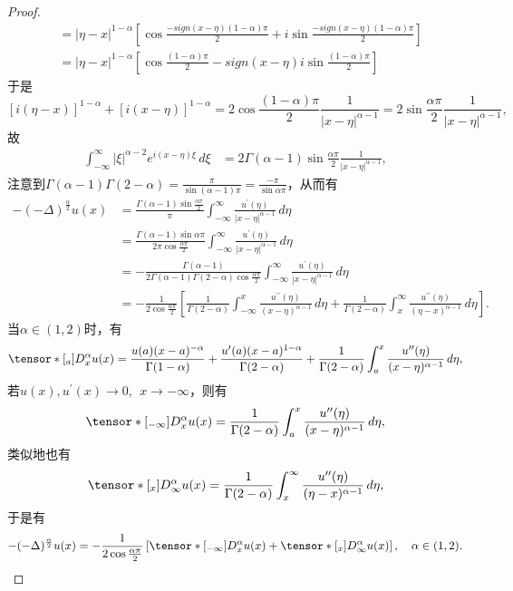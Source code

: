 \begin{proof}
$$\begin{aligned}
&=|\eta-x|^{1-\alpha}\left[ \cos \frac{-sign(x-\eta)(1-\alpha)\pi}2+i\sin \frac{-sign(x-\eta)(1-\alpha)\pi}2 \right]\\
&=|\eta-x|^{1-\alpha}\left[ \cos \frac{(1-\alpha)\pi}2-sign(x-\eta)i\sin \frac{(1-\alpha)\pi}2 \right]
\end{aligned}
$$
于是
$$
[i(\eta-x)]^{1-\alpha} + [i(x-\eta)]^{1-\alpha}=2\cos\frac{(1-\alpha)\pi}2\frac{1}{|x-\eta|^{\alpha-1}}=2\sin\frac{\alpha\pi}2\frac{1}{|x-\eta|^{\alpha-1}},
$$
故
$$
\begin{aligned}
\int_{-\infty}^\infty |\xi|^{\alpha-2}   e^{i(x-\eta)\xi}\,d\xi &= 2\Gamma(\alpha-1)\sin\frac{\alpha\pi}2   \frac{1}{|x-\eta|^{\alpha-1}},
\end{aligned}
$$
注意到$\Gamma(\alpha-1)\Gamma(2-\alpha)=\frac{\pi}{\sin(\alpha-1)\pi}=\frac{-\pi}{\sin\alpha\pi}$，从而有
$$
\begin{aligned}
-(-\Delta)^{\frac\alpha2}u(x)&=\frac{\Gamma(\alpha-1)\sin\frac{\alpha\pi}2}{\pi}\int_{-\infty}^\infty \frac{u^\prime(\eta)}{|x-\eta|^{\alpha-1}}   \,d\eta\\
&=\frac{\Gamma(\alpha-1)\sin \alpha\pi}{2\pi\cos\frac{\alpha\pi}2}\int_{-\infty}^\infty \frac{u^\prime(\eta)}{|x-\eta|^{\alpha-1}}   \,d\eta\\
&=-\frac{\Gamma(\alpha-1)}{2\Gamma(\alpha-1)\Gamma(2-\alpha)\cos\frac{\alpha\pi}2}\int_{-\infty}^\infty  \frac{u^\prime(\eta)}{|x-\eta|^{\alpha-1}}   \,d\eta\\
&=-\frac{1}{2\cos\frac{\alpha\pi}2}\left[\frac1{\Gamma(2-\alpha)}\int_{-\infty}^x \frac{u^{\prime\prime}(\eta)}{(x-\eta)^{\alpha-1}}   \,d\eta+\frac1{\Gamma(2-\alpha)}\int_{x}^\infty\frac{ u^{\prime\prime}(\eta)}{(\eta-x)^{\alpha-1}}   \,d\eta\right].
\end{aligned}
$$
当$\alpha\in(1,2)$时，有
$$
\tensor*[_a]{D}{_x^\alpha} u(x)=\frac{u(a)(x-a)^{-\alpha}}{\Gamma(1-\alpha)}+\frac{u^\prime(a)(x-a)^{1-\alpha}}{\Gamma(2-\alpha)}+\frac1{\Gamma(2-\alpha)}\int_{a}^x \frac{u^{\prime\prime}(\eta)}{(x-\eta)^{\alpha-1}}   \,d\eta,
$$
若$u(x),u^\prime(x)\to 0, ~~x\to-\infty$，则有
$$
\tensor*[_{-\infty}]{D}{_x^\alpha} u(x)=\frac1{\Gamma(2-\alpha)}\int_{a}^x \frac{u^{\prime\prime}(\eta)}{(x-\eta)^{\alpha-1}}   \,d\eta,
$$
类似地也有
$$
\tensor*[_x]{D}{_\infty^\alpha} u(x)=\frac{1}{\Gamma(2-\alpha)}\int_x^{\infty} \frac{u^{\prime\prime}(\eta)}{(\eta-x)^{\alpha-1}}   \,d\eta,
$$
于是有
$$
-(-\Delta)^{\frac\alpha2}u(x)=-\frac{1}{2\cos\frac{\alpha\pi}2}\left[\tensor*[_{-\infty}]{D}{_x^\alpha} u(x)+\tensor*[_x]{D}{_\infty^\alpha} u(x)\right], \quad \alpha\in(1,2).
$$
\end{proof}


